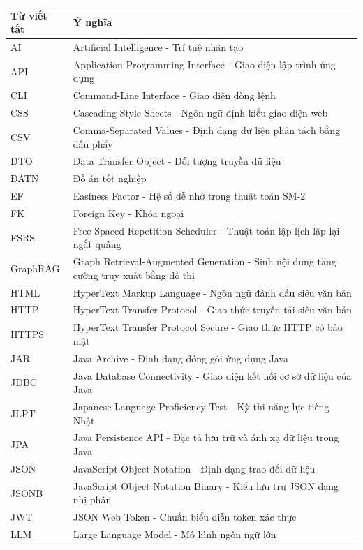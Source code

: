 \documentclass[../DoAn.tex]{subfiles}
\begin{document}
\begin{longtable}{|p{3cm}|p{11cm}|}
\hline
\textbf{Từ viết tắt} & \textbf{Ý nghĩa} \\
\hline
AI & Artificial Intelligence - Trí tuệ nhân tạo \\
\hline
API & Application Programming Interface - Giao diện lập trình ứng dụng \\
\hline
CLI & Command-Line Interface - Giao diện dòng lệnh \\
\hline
CSS & Cascading Style Sheets - Ngôn ngữ định kiểu giao diện web \\
\hline
CSV & Comma-Separated Values - Định dạng dữ liệu phân tách bằng dấu phẩy \\
\hline
DTO & Data Transfer Object - Đối tượng truyền dữ liệu \\
\hline
ĐATN & Đồ án tốt nghiệp \\
\hline
EF & Easiness Factor - Hệ số dễ nhớ trong thuật toán SM-2 \\
\hline
FK & Foreign Key - Khóa ngoại \\
\hline
FSRS & Free Spaced Repetition Scheduler - Thuật toán lập lịch lặp lại ngắt quãng \\
\hline
GraphRAG & Graph Retrieval-Augmented Generation - Sinh nội dung tăng cường truy xuất bằng đồ thị \\
\hline
HTML & HyperText Markup Language - Ngôn ngữ đánh dấu siêu văn bản \\
\hline
HTTP & HyperText Transfer Protocol - Giao thức truyền tải siêu văn bản \\
\hline
HTTPS & HyperText Transfer Protocol Secure - Giao thức HTTP có bảo mật \\
\hline
JAR & Java Archive - Định dạng đóng gói ứng dụng Java \\
\hline
JDBC & Java Database Connectivity - Giao diện kết nối cơ sở dữ liệu của Java \\
\hline
JLPT & Japanese-Language Proficiency Test - Kỳ thi năng lực tiếng Nhật \\
\hline
JPA & Java Persistence API - Đặc tả lưu trữ và ánh xạ dữ liệu trong Java \\
\hline
JSON & JavaScript Object Notation - Định dạng trao đổi dữ liệu \\
\hline
JSONB & JavaScript Object Notation Binary - Kiểu lưu trữ JSON dạng nhị phân \\
\hline
JWT & JSON Web Token - Chuẩn biểu diễn token xác thực \\
\hline
LLM & Large Language Model - Mô hình ngôn ngữ lớn \\

\end{longtable}
\end{document}
